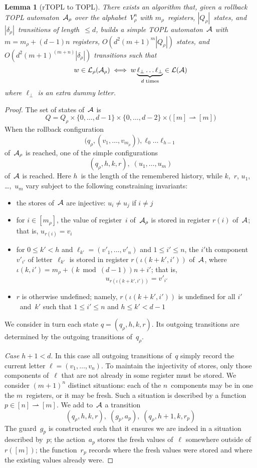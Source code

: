 \documentclass[9pt, preprint]{sigplanconf} %
\newcommand{\pmap}{\rightharpoonup}
\newtheorem{lemma}{Lemma}
\theoremstyle{definition}
\theoremstyle{remark}
\begin{document}
\begin{lemma}[rTOPL to TOPL]\label{lemma:rtopl-to-topl}
There exists an algorithm that, given a rollback TOPL automaton~${\cal A}_\rho$ over the alphabet~$V_\rho^n$ with $m_\rho$~registers, $|Q_\rho|$~states, and $|\delta_\rho|$~transitions of length~$\le d$, builds a simple TOPL automaton~${\cal A}$ with $m=m_\rho+(d-1)n$ registers, $O(d^2 (m+1)^m|Q_\rho|)$ states, and $O(d^2 (m+1)^{(m+n)}|\delta_\rho|)$ transitions such that
\[ w\in{\cal L}_\rho({\cal A}_\rho) \iff w\underbrace{\ell_\bot\ldots\ell_\bot}_{\text{$d$~times}}\in{\cal L}({\cal A})\]
where $\ell_\bot$ is an extra dummy letter.
\end{lemma}
\begin{proof}
The set of states of~${\cal A}$ is \[Q=Q_\rho\times\{0,\ldots,d-1\}\times\{0,\ldots,d-2\}\times\bigl([m]\pmap[m]\bigr)\]
When the rollback configuration
\[ \bigl(q_\rho,(v_1,\ldots,v_{m_\rho})\bigr),\ell_0\ldots\ell_{h-1}\]
of~${\cal A}_\rho$ is reached, one of the simple configurations
\[ (q_\rho,h,k,r),\;(u_1,\ldots,u_m) \]
of~${\cal A}$ is reached.
Here $h$~is the length of the remembered history, while $k$,~$r$, $u_1$, \dots,~$u_m$ vary subject to the following constraining invariants:
\begin{itemize}
\item the stores of~${\cal A}$ are injective: $u_i \ne u_j$ if $i\ne j$
\item for $i\in[m_\rho]$, the value of register~$i$ of~${\cal A}_\rho$ is stored in register $r(i)$ of~${\cal A}$; that is, $ u_{r(i)} = v_i $
\item for $0\le k'<h$ and $\ell_{k'}=(v'_1,\ldots,v'_n)$ and $1\le i'\le n$, the $i'$th component~$v'_{i'}$ of letter~$\ell_{k'}$ is stored in register $r(\iota(k+k',i'))$ of~${\cal A}$, where $\iota(k,i')=m_\rho+(k\bmod(d-1))n+i'$; that is,
  \[u_{r(\iota(k+k',i'))}=v'_{i'}\]
\item $r$ is otherwise undefined; namely, $r(\iota(k+k',i'))$ is undefined for all $i'$~and~$k'$ such that $1\le i'\le n$ and $h\le k'<d-1$
\end{itemize}

\smallskip
We consider in turn each state $q=(q_\rho,h,k,r)$.
Its outgoing transitions are determined by the outgoing transitions of~$q_\rho$.

{\it Case $h+1<d$}.
In this case all outgoing transitions of~$q$ simply record the current letter $\ell=(v_1,\ldots,v_n)$.
To maintain the injectivity of stores, only those components of~$\ell$ that are not already in some register must be stored.
We consider $(m+1)^n$ distinct situations: each of the $n$~components may be in one the $m$~registers, or it may be fresh.
Such a situation is described by a function $p\in[n]\pmap[m]$.
We add to~${\cal A}$ a transition
\[ (q_\rho,h,k,r),\;(g_p,a_p),\;(q_\rho,h+1,k,r_p)\]
The guard~$g_p$ is constructed such that it ensures we are indeed in a situation described by~$p$; the action~$a_p$ stores the fresh values of~$\ell$ somewhere outside of $r([m])$; the function~$r_p$ records where the fresh values were stored and where the existing values already were.


\end{proof}
\end{document}

